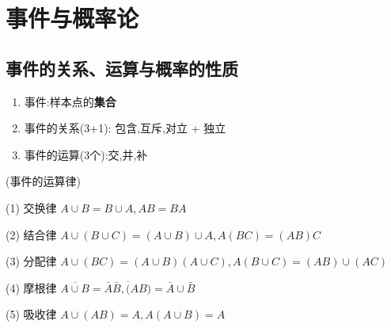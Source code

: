 \documentclass[12pt, a4paper, oneside, UTF8]{ctexbook}
\begin{document}
% 
\else
\fi

\chapter{事件与概率论}
\section{事件的关系、运算与概率的性质}
\begin{enumerate}
    \item 事件:样本点的\textbf{集合} 
    \item 事件的关系(3+1): 包含,互斥,对立 + 独立 
    \item 事件的运算(3个):交,并,补
\end{enumerate}
\begin{remark}(事件的运算律)
    \item [(1)]\quad 交换律 \qquad $A\cup B = B\cup A, AB=BA$
    \item [(2)]\quad 结合律 \qquad $A\cup(B\cup C)=(A\cup B)\cup A, A(BC)=(AB)C$
    \item [(3)]\quad 分配律 \qquad $A\cup(BC)=(A\cup B)(A\cup C), A(B\cup C)=(AB)\cup(AC)$
    \item [(4)]\quad 摩根律 \qquad $\overline{A\cup B}=\bar{A}\bar{B},\overline(AB)=\bar{A}\cup\bar{B}$
    \item [(5)]\quad 吸收律 \qquad $A\cup(AB)=A,A(A\cup B)=A$
\end{remark}
\end{document}
